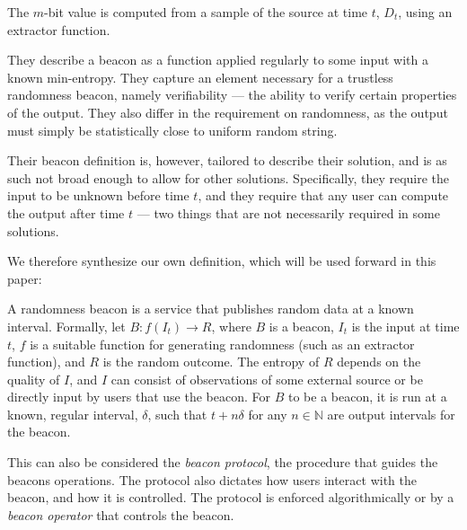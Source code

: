 The $m$-bit value is computed from a sample of the source at time $t$, $D_t$, using an extractor function. 

They describe a beacon as a function applied regularly to some input with a known min-entropy.
They capture an element necessary for a trustless randomness beacon, namely verifiability --- the ability to verify certain properties of the output.
They also differ in the requirement on randomness, as the output must simply be statistically close to uniform random string.

Their beacon definition is, however, tailored to describe their solution, and is as such not broad enough to allow for other solutions.
Specifically, they require the input to be unknown before time $t$, and they require that any user can compute the output after time $t$ --- two things that are not necessarily required in some solutions.


We therefore synthesize our own definition, which will be used forward in this paper:

A  randomness beacon is a service that publishes random data at a known interval.
Formally, let $B: f(I_t) \rightarrow R$, where $B$ is a beacon, $I_t$ is the input at time $t$, $f$ is a suitable function for generating randomness (such as an extractor function), and $R$ is the random outcome. The entropy of $R$ depends on the quality of $I$, and $I$ can consist of observations of some external source or be directly input by users that use the beacon.
For $B$ to be a beacon, it is run at a known, regular interval, $\delta$, such that $t+n\delta$ for any $n \in \mathbb{N}$ are output intervals for the beacon.

This can also be considered the \emph{beacon protocol}, the procedure that guides the beacons operations. The protocol also dictates how users interact with the beacon, and how it is controlled. The protocol is enforced algorithmically or by a \emph{beacon operator} that controls the beacon.


